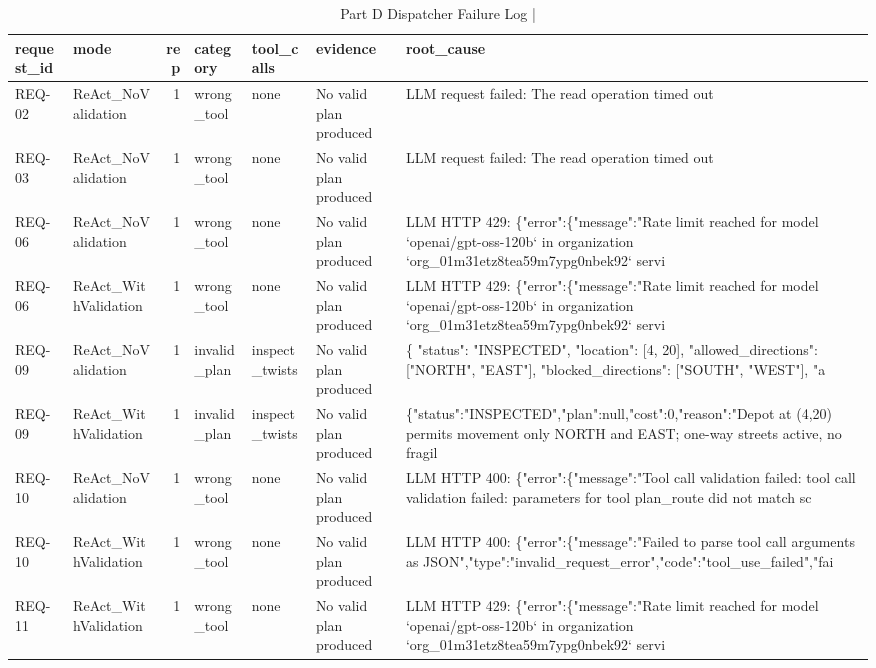 \begin{table}[htbp]
\centering
\caption{Part D Dispatcher Failure Log | \stampline}
\label{tab:partD_failures}
\begin{tabular}{llrllll}
\toprule
request\_id & mode & rep & category & tool\_calls & evidence & root\_cause \\
\midrule
REQ-02 & ReAct\_NoValidation & 1 & wrong\_tool & none & No valid plan produced & LLM request failed: The read operation timed out \\
REQ-03 & ReAct\_NoValidation & 1 & wrong\_tool & none & No valid plan produced & LLM request failed: The read operation timed out \\
REQ-06 & ReAct\_NoValidation & 1 & wrong\_tool & none & No valid plan produced & LLM HTTP 429: \{"error":\{"message":"Rate limit reached for model `openai/gpt-oss-120b` in organization `org\_01m31etz8tea59m7ypg0nbek92` servi \\
REQ-06 & ReAct\_WithValidation & 1 & wrong\_tool & none & No valid plan produced & LLM HTTP 429: \{"error":\{"message":"Rate limit reached for model `openai/gpt-oss-120b` in organization `org\_01m31etz8tea59m7ypg0nbek92` servi \\
REQ-09 & ReAct\_NoValidation & 1 & invalid\_plan & inspect\_twists & No valid plan produced & \{
  "status": "INSPECTED",
  "location": [4, 20],
  "allowed\_directions": ["NORTH", "EAST"],
  "blocked\_directions": ["SOUTH", "WEST"],
  "a \\
REQ-09 & ReAct\_WithValidation & 1 & invalid\_plan & inspect\_twists & No valid plan produced & \{"status":"INSPECTED","plan":null,"cost":0,"reason":"Depot at (4,20) permits movement only NORTH and EAST; one-way streets active, no fragil \\
REQ-10 & ReAct\_NoValidation & 1 & wrong\_tool & none & No valid plan produced & LLM HTTP 400: \{"error":\{"message":"Tool call validation failed: tool call validation failed: parameters for tool plan\_route did not match sc \\
REQ-10 & ReAct\_WithValidation & 1 & wrong\_tool & none & No valid plan produced & LLM HTTP 400: \{"error":\{"message":"Failed to parse tool call arguments as JSON","type":"invalid\_request\_error","code":"tool\_use\_failed","fai \\
REQ-11 & ReAct\_WithValidation & 1 & wrong\_tool & none & No valid plan produced & LLM HTTP 429: \{"error":\{"message":"Rate limit reached for model `openai/gpt-oss-120b` in organization `org\_01m31etz8tea59m7ypg0nbek92` servi \\

\end{tabular}
\end{table}
